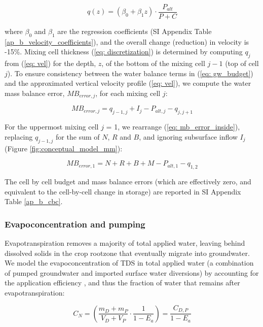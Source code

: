 \begin{equation}
q(z) = (\beta_0 + \beta_1 z) \cdot \frac{P_{alt}}{P+C}
\label{eq: vel}
\end{equation}

where $\beta_0$ and $\beta_1$ are the regression coefficients (SI Appendix Table \ref{ap_b_velocity_coefficients}), and the overall change (reduction) in velocity is -15\%. Mixing cell thickness (\ref{eq: discretization}) is determined by computing $q_j$ from (\ref{eq: vel}) for the depth, $z$, of the bottom of the mixing cell $j-1$ (top of cell $j$). To ensure consistency between the water balance terms in (\ref{eq: gw_budget}) and the approximated vertical velocity profile (\ref{eq: vel}), we compute the water mass balance error, $MB_{error, j}$, for each mixing cell $j$:

\begin{equation}
MB_{error, j} = q_{j-1,j} + I_j - P_{alt,j} - q_{j,j+1}
\label{eq: mb_error_inside}
\end{equation}

For the uppermost mixing cell $j$ = 1, we rearrange (\ref{eq: mb_error_inside}), replacing $q_{j-1,j}$ for the sum of $N$, $R$ and $B$, and ignoring subsurface inflow $I_j$ (Figure \ref{fig:conceptual_model_mm}):

\begin{equation}
MB_{error, 1} = N + R + B + M - P_{alt,1} - q_{1,2}
\label{eq: mb_error_top}
\end{equation}

The cell by cell budget and mass balance errors (which are effectively zero, and equivalent to the cell-by-cell change in storage) are reported in SI Appendix Table \ref{ap_b_cbc}.


%
%
\subsubsection{Evapoconcentration and pumping}
\label{ss_2_7}

Evapotranspiration removes a majority of total applied water, leaving behind dissolved solids in the crop rootzone that eventually migrate into groundwater. We model the evapoconcentration of TDS in total applied water (a combination of pumped groundwater and imported surface water diversions) by accounting for the application efficiency \citep{burt1997irrigation}, and thus the fraction of water that remains after evapotranspiration:  

\begin{equation}
C_N = \left( \frac{m_D + m_P}{V_D + V_P} \cdot \frac{1}{1 - E_a} \right) = \frac{C_{D,P}}{1 - E_a}
\end{equation}

